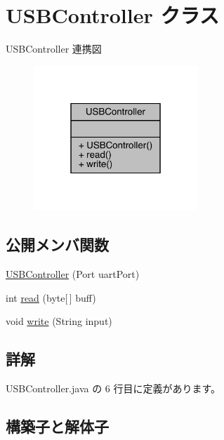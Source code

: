 \hypertarget{class_u_s_b_controller}{}\section{U\+S\+B\+Controller クラス}
\label{class_u_s_b_controller}


U\+S\+B\+Controller 連携図
\nopagebreak
\begin{figure}[H]
\begin{center}
\leavevmode
\includegraphics[width=175pt]{d2/d26/class_u_s_b_controller__coll__graph}
\end{center}
\end{figure}
\subsection*{公開メンバ関数}
\begin{DoxyCompactItemize}
\item 
\mbox{\hyperlink{class_u_s_b_controller_a83cc9657eb9075939d8ceec288854082}{U\+S\+B\+Controller}} (Port uart\+Port)
\item 
int \mbox{\hyperlink{class_u_s_b_controller_a501ec097a24850ae2a6fae87c9b2eb8b}{read}} (byte\mbox{[}$\,$\mbox{]} buff)
\item 
void \mbox{\hyperlink{class_u_s_b_controller_afe8a9c9fdb005132410e327153c984f4}{write}} (String input)
\end{DoxyCompactItemize}


\subsection{詳解}


 U\+S\+B\+Controller.\+java の 6 行目に定義があります。



\subsection{構築子と解体子}
\mbox{\label{class_u_s_b_controller_a83cc9657eb9075939d8ceec288854082}} 
